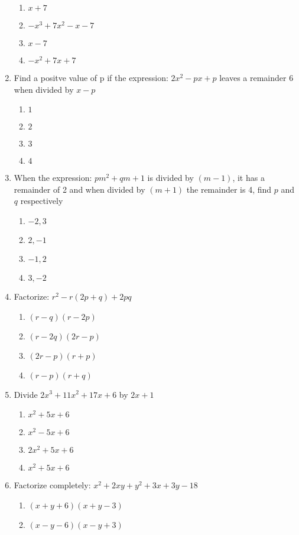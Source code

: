 \begin{multicols}{2}
\begin{enumerate}[label={\arabic*.}]
\begin{enumerate}[label={\Alph*.}]
	\item \(x+7\)
	\item \(-x^3 + 7x^2 -x -7\)
	\item \(x-7\)
	\item \(-x^2 + 7x + 7\)
	\end{enumerate}
\item Find a positve value of p if the expression: $2x^2 - px + p$ leaves a remainder 6 when divided by $x-p$
	\begin{enumerate}[label={\Alph*.}]
	\item \(1\)
	\item \(2\)
	\item \(3\)
	\item \(4\)
	\end{enumerate}
\item When the expression: $pm^2 + qm + 1$ is divided by $(m-1)$, it has a remainder of 2 and when divided by $(m+1)$ the remainder is 4, find $p$ and $q$ respectively
	\begin{enumerate}[label={\Alph*.}]
	\item \(-2,3\)
	\item \(2,-1\)
	\item \(-1,2\)
	\item \(3,-2\)
	\end{enumerate}
\item Factorize: $r^2 - r(2p + q) + 2pq $
	\begin{enumerate}[label={\Alph*.}]
	\item \((r-q)(r-2p)\)
	\item \((r-2q)(2r-p)\)
	\item \((2r - p)(r+p)\)
	\item \((r-p)(r+q)\)
	\end{enumerate}
\item Divide $2x^3 + 11x^2 +  17x + 6$ by $2x +1$ 
	\begin{enumerate}[label={\Alph*.}]
	\item \(x^2 + 5x + 6\)
	\item \(x^2 - 5x + 6\)
	\item \(2x^2 + 5x + 6\)
	\item \(x^2 + 5x + 6\)
	\end{enumerate}
\item Factorize completely: $x^2 + 2xy + y^2 + 3x + 3y -18$
	\begin{enumerate}[label={\Alph*.}]
	\item \((x+y+6)(x+y-3)\)
	\item \((x-y-6)(x-y+3)\)

\end{enumerate}
\end{enumerate}
\end{multicols}
